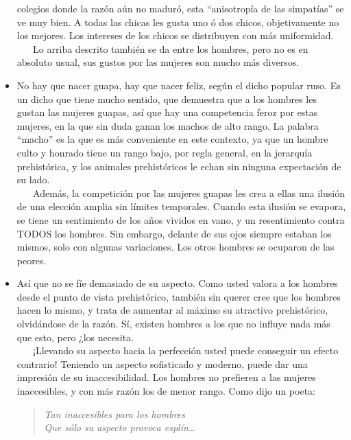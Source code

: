 \begin{itemize}
  colegios donde la razón aún no maduró, esta ``anisotropía de las
  simpatías'' se ve muy bien. A todas las chicas les gusta uno ó dos
  chicos, objetivamente no los mejores. Los intereses de los chicos se
  distribuyen con más uniformidad.\\
  \hspace*{0.333em} ~ ~ Lo arriba descrito también se da entre los
  hombres, pero no es en absoluto usual, sus gustos por las mujeres son
  mucho más diversos.
\item
  No hay que nacer guapa, hay que nacer feliz, según el dicho popular
  ruso. Es un dicho que tiene mucho sentido, que demuestra que a los
  hombres les gustan las mujeres guapas, así que hay una competencia
  feroz por estas mujeres, en la que sin duda ganan los machos de alto
  rango. La palabra ``macho'' es la que es más conveniente en este
  contexto, ya que un hombre culto y honrado tiene un rango bajo, por
  regla general, en la jerarquía prehistórica, y los animales
  prehistóricos le echan sin ninguna expectación de su lado.\\
  \hspace*{0.333em} ~ ~ Además, la competición por las mujeres guapas
  les crea a ellas una ilusión de una elección amplia sin límites
  temporales. Cuando esta ilusión se evapora, se tiene un sentimiento de
  los años vividos en vano, y un resentimiento contra TODOS los hombres.
  Sin embargo, delante de sus ojos siempre estaban los mismos, solo con
  algunas variaciones. Los otros hombres se ocuparon de las peores.
\item
  Así que no se fíe demasiado de su aspecto. Como usted valora a los
  hombres desde el punto de vista prehistórico, también sin querer cree
  que los hombres hacen lo mismo, y trata de aumentar al máximo su
  atractivo prehistórico, olvidándose de la razón. Sí, existen hombres a
  los que no influye nada más que esto, pero ¿los necesita.\\
  \hspace*{0.333em} ~ ~ ¡Llevando su aspecto hacia la perfección usted
  puede conseguir un efecto contrario! Teniendo un aspecto sofisticado y
  moderno, puede dar una impresión de su inaccesibilidad. Los hombres no
  prefieren a las mujeres inaccesibles, y con más razón los de menor
  rango. Como dijo un poeta:

  \begin{quote}
   \emph{Tan inaccesibles para los hombres \\
   Que sólo su aspecto provoca esplín…}
  \end{quote}
  

\end{itemize}
